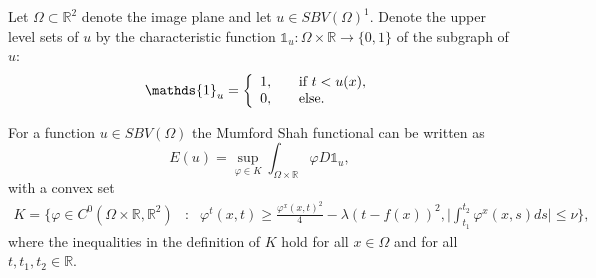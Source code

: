 
        

        Let $\Omega \subset \mathbb{R}^{2}$ denote the image plane and let $u \in SBV(\Omega)^{1}$. Denote the upper level sets of $u$ by the characteristic function $\mathds{1}_{u}: \Omega \times \mathbb{R} \longrightarrow \{ 0, 1 \}$ of the subgraph of $u$:
            \begin{equation}
                \mathds{1}_{u} =
                    \left\{
                        \begin{array}{l l}
                            1, & \quad \text{if $t < u(x)$}, \\
                            0, & \quad \text{else}.
                        \end{array}
                    \right.
            \end{equation}

        \begin{theorem}
            For a function $u \in SBV(\Omega)$ the Mumford Shah functional can be written as
                \begin{equation}
                    E(u) = \sup_{\varphi \in K} \int_{\Omega \times \mathbb{R}} \varphi D\mathds{1}_{u}, \label{eq:MSwithsup}
                \end{equation}
            with a convex set
                \begin{eqnarray}
                    K = \bigg\{ \varphi \in C^{0}(\Omega \times \mathbb{R}, \mathbb{R}^{2}) &:& \varphi^{t}(x, t) \ge \frac{\varphi^{x}(x,t)^{2}}{4} - \lambda(t - f(x))^{2}, \bigg| \int^{t_{2}}_{t_{1}} \varphi^{x}(x,s)ds \bigg| \le \nu \bigg\}, \label{eq:ContK}
                \end{eqnarray}
            where the inequalities in the definition of $K$ hold for all $x \in \Omega$ and for all $t, t_{1}, t_{2} \in \mathbb{R}$.
        \end{theorem}

